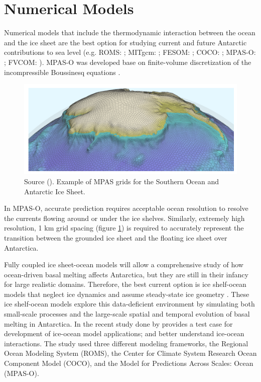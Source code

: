 \documentclass[11pt,a4paper]{article}
\begin{document}
	
	
	\section{Numerical Models}
	
	
	Numerical models that include the thermodynamic interaction between the ocean and the ice sheet are the best option for studying current and future Antarctic contributions to sea level (e.g. ROMS: \cite{dinniman2007influence}; MITgcm: \cite{losch2008modeling}; FESOM: \cite{timmermann2012ice}; COCO: \cite{kusahara2013modeling}; MPAS-O: \cite{ringler2013multi}; FVCOM: \cite{zhou2020modeling}).
	MPAS-O was developed base on finite-volume discretization of the incompressible Boussinesq equations \citep{ringler2013multi}.
	
	\begin{figure}[H]
	    \centering 
	    \includegraphics[width=13cm]{MPASg.png}
	    \caption{Source (\cite{MPAS}). Example of MPAS grids for the Southern Ocean and Antarctic Ice Sheet.}
	    \label{fig:4}
	\end{figure}
	
	\noindent In MPAS-O, accurate prediction requires acceptable ocean resolution to resolve the currents flowing around or under the ice shelves. Similarly, extremely high resolution, 1 km grid spacing (figure \ref{fig:4}) is required to accurately represent the transition between the grounded ice sheet and the floating ice sheet over Antarctica.
	
	Fully coupled ice sheet-ocean models will allow a comprehensive study of how ocean-driven basal melting affects Antarctica, but they are still in their infancy for large realistic domains. Therefore, the best current option is ice shelf-ocean models that neglect ice dynamics and assume steady-state ice geometry \citep{gwyther2020vertical}. These ice shelf-ocean models explore this data-deficient environment by simulating both small-scale processes and the large-scale spatial and temporal evolution of basal melting in Antarctica. In the recent study done by \cite{gwyther2020vertical} provides a test case for development of ice-ocean model applications; and better understand ice-ocean interactions. The study used three different modeling frameworks, the Regional Ocean Modeling System (ROMS), the Center for Climate System Research Ocean Component Model (COCO), and the Model for Predictions Across Scales: Ocean (MPAS-O).
	
\end{document}
